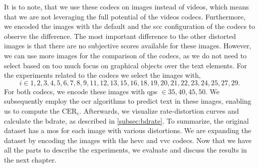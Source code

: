 It is to note, that we use these codecs on images instead of videos, which means that we are not leveraging the full potential of the videos codecs.
Furthermore, we encoded the images with the default and the \gls{scc} configuration of the codecs to observe the difference.
The most important difference to the other distorted images is that there are no subjective scores available for these images.
However, we can use more images for the comparison of the codecs, as we do not need to select based on too much focus on graphical objects over the text elements.
For the experiments related to the codecs we select the images with,
\begin{equation}
    i \in {1, 2, 3, 4, 5, 6, 7, 8, 9, 11, 12, 13, 15, 16, 18, 19, 20, 21, 22, 23, 24, 25, 27, 29}.
\end{equation}
For both codecs, we encode these images with \glspl{qp} $\in {35, 40, 45, 50}$.
We subsequently employ the \gls{ocr} algorithms to predict text in these images, enabling us to compute the $\text{CER}_{\text{c}}$.
Afterwards, we visualize rate-distortion curves and calculate the \gls{bdrate}, as described in \autoref{subsec:bdrate}.
To summarize, the original dataset has a \gls{mos} for each image with various distortions.
We are expanding the dataset by encoding the images with the \gls{hevc} and \gls{vvc} codecs.
Now that we have all the parts to describe the experiments, we evaluate and discuss the results in the next chapter.
